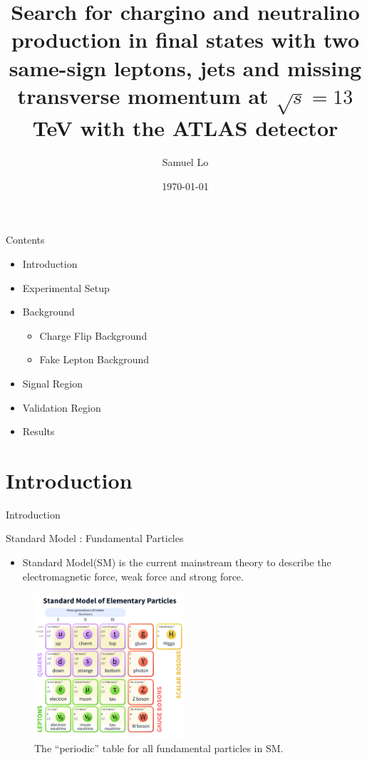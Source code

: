 \documentclass[mathserif,serif]{beamer}
\title[Lo Cheuk Yee]{Search for chargino and neutralino production in final states with two same-sign leptons, jets and missing transverse momentum at $\sqrt{s} = 13$ TeV with the ATLAS detector}
\author[]
{
Samuel Lo
}
\institute[]
{
The University of Hong Kong
}
\date[]{\today}
\begin{document}
\frame{\titlepage}

\begin{frame}{Contents}
\begin{itemize}
\item Introduction
\item Experimental Setup
\item Background
\begin{itemize}
\item Charge Flip Background
\item Fake Lepton Background
\end{itemize}
\item Signal Region
\item Validation Region
\item Results
\end{itemize}
\end{frame}

\section{Introduction}
\begin{frame}
\begin{center}
\huge
Introduction
\end{center}
\end{frame}

\begin{frame}{Standard Model : Fundamental Particles}
\begin{itemize}
\item Standard Model(SM) is the current mainstream theory to describe the electromagnetic force, weak force and strong force.
\end{itemize}

\begin{figure}
\centering
\includegraphics[width=0.5\textwidth]{data/photo/theory/SM_particles.png}
\caption{The ``periodic'' table for all fundamental particles in SM.}
\end{figure}
\end{frame}
\end{document}
